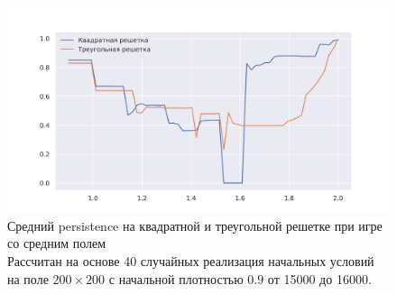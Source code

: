 \documentclass[12pt]{article}
\begin{document}
        \begin{figure}[!h]
            \centering
            \captionsetup{justification=centering}
            \includegraphics[width=\linewidth]{TriangularMeanFieldGame/persistence.png}
            \caption{Средний persistence на квадратной и треугольной решетке при игре со средним полем\\
            Рассчитан на основе 40 случайных реализация начальных условий на поле $200\times200$ с начальной плотностью $0.9$ от 15000 до 16000.\\
            }
            \label{fig:persistencemean}
        \end{figure}
        
\end{document}

